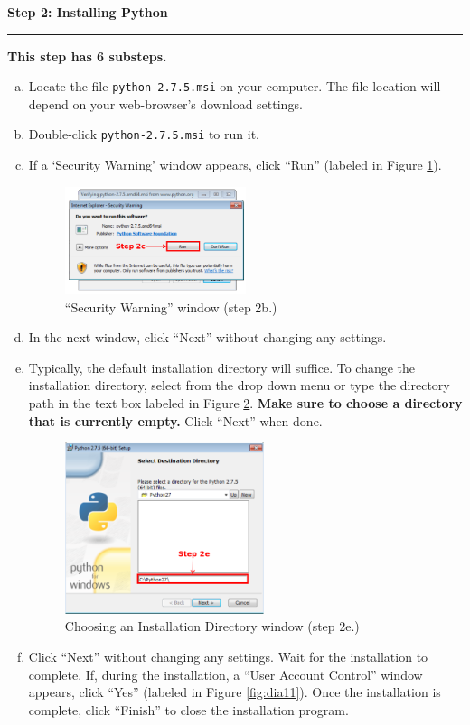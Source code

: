 \documentclass[11pt,english]{article}
\newcommand{\myhrule}{\vspace{0.3cm}\hrule\vspace{0.3cm}}
\begin{document}
\newpage
{\Large {\bf Step 2: Installing Python}}
\myhrule
{\bf This step has 6 substeps.}
\begin{enumerate}[a.]
\item Locate the file \texttt{python-2.7.5.msi} on your computer. The file
location will depend on your web-browser's download settings.
\item Double-click \texttt{python-2.7.5.msi} to run it.
\item If a `Security Warning' window appears, click ``Run'' (labeled in Figure
\ref{fig:dia2}).
\begin{figure}[h]
\begin{center}
\includegraphics[width=0.5\textwidth]{dia2}
\end{center}
\vspace{-0.5cm}
\caption{``Security Warning'' window (step 2b.)}
\label{fig:dia2}
\end{figure}
\item In the next window, click ``Next'' without changing any settings.
\item Typically, the default installation directory will suffice. To change the
installation directory, select from the drop down menu or type the directory
path in the text box labeled in Figure \ref{fig:dia3}. {\bf Make sure to choose
a directory that is currently empty.} Click ``Next'' when done.
\begin{figure}[h]
\begin{center}
\includegraphics[width=0.55\textwidth]{dia3}
\end{center}
\vspace{-0.5cm}
\caption{Choosing an Installation Directory window (step 2e.)}
\label{fig:dia3}
\end{figure}
\newpage
\item Click ``Next'' without changing any settings. Wait for the installation
to complete. If, during the installation, a ``User Account Control'' window
appears, click  ``Yes'' (labeled in Figure \ref{fig:dia11}). Once the
installation is complete, click ``Finish'' to close the installation program.
\end{enumerate}
\end{document}
